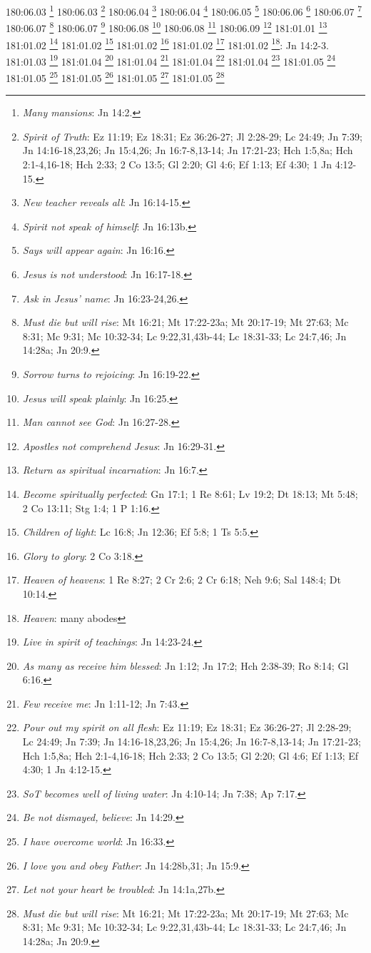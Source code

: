 {{{{{{{{{{{{{{{{{{{{{{{{{{{{{{{{{{{{{{{{{{{{{{{{{{{{{{{{{{{{{{{{{{{{{{{{{{{{{{{180:06.03 \footnote{\textit{Many mansions}: Jn 14:2.}
180:06.03 \footnote{\textit{Spirit of Truth}: Ez 11:19; Ez 18:31; Ez 36:26-27; Jl 2:28-29; Lc 24:49; Jn 7:39; Jn 14:16-18,23,26; Jn 15:4,26; Jn 16:7-8,13-14; Jn 17:21-23; Hch 1:5,8a; Hch 2:1-4,16-18; Hch 2:33; 2 Co 13:5; Gl 2:20; Gl 4:6; Ef 1:13; Ef 4:30; 1 Jn 4:12-15.}
180:06.04 \footnote{\textit{New teacher reveals all}: Jn 16:14-15.}
180:06.04 \footnote{\textit{Spirit not speak of himself}: Jn 16:13b.}
180:06.05 \footnote{\textit{Says will appear again}: Jn 16:16.}
180:06.06 \footnote{\textit{Jesus is not understood}: Jn 16:17-18.}
180:06.07 \footnote{\textit{Ask in Jesus' name}: Jn 16:23-24,26.}
180:06.07 \footnote{\textit{Must die but will rise}: Mt 16:21; Mt 17:22-23a; Mt 20:17-19; Mt 27:63; Mc 8:31; Mc 9:31; Mc 10:32-34; Lc 9:22,31,43b-44; Lc 18:31-33; Lc 24:7,46; Jn 14:28a; Jn 20:9.}
180:06.07 \footnote{\textit{Sorrow turns to rejoicing}: Jn 16:19-22.}
180:06.08 \footnote{\textit{Jesus will speak plainly}: Jn 16:25.}
180:06.08 \footnote{\textit{Man cannot see God}: Jn 16:27-28.}
180:06.09 \footnote{\textit{Apostles not comprehend Jesus}: Jn 16:29-31.}
181:01.01 \footnote{\textit{Return as spiritual incarnation}: Jn 16:7.}
181:01.02 \footnote{\textit{Become spiritually perfected}: Gn 17:1; 1 Re 8:61; Lv 19:2; Dt 18:13; Mt 5:48; 2 Co 13:11; Stg 1:4; 1 P 1:16.}
181:01.02 \footnote{\textit{Children of light}: Lc 16:8; Jn 12:36; Ef 5:8; 1 Ts 5:5.}
181:01.02 \footnote{\textit{Glory to glory}: 2 Co 3:18.}
181:01.02 \footnote{\textit{Heaven of heavens}: 1 Re 8:27; 2 Cr 2:6; 2 Cr 6:18; Neh 9:6; Sal 148:4; Dt 10:14.}
181:01.02 \footnote{\textit{Heaven}: many abodes}: Jn 14:2-3.}
181:01.03 \footnote{\textit{Live in spirit of teachings}: Jn 14:23-24.}
181:01.04 \footnote{\textit{As many as receive him blessed}: Jn 1:12; Jn 17:2; Hch 2:38-39; Ro 8:14; Gl 6:16.}
181:01.04 \footnote{\textit{Few receive me}: Jn 1:11-12; Jn 7:43.}
181:01.04 \footnote{\textit{Pour out my spirit on all flesh}: Ez 11:19; Ez 18:31; Ez 36:26-27; Jl 2:28-29; Lc 24:49; Jn 7:39; Jn 14:16-18,23,26; Jn 15:4,26; Jn 16:7-8,13-14; Jn 17:21-23; Hch 1:5,8a; Hch 2:1-4,16-18; Hch 2:33; 2 Co 13:5; Gl 2:20; Gl 4:6; Ef 1:13; Ef 4:30; 1 Jn 4:12-15.}
181:01.04 \footnote{\textit{SoT becomes well of living water}: Jn 4:10-14; Jn 7:38; Ap 7:17.}
181:01.05 \footnote{\textit{Be not dismayed, believe}: Jn 14:29.}
181:01.05 \footnote{\textit{I have overcome world}: Jn 16:33.}
181:01.05 \footnote{\textit{I love you and obey Father}: Jn 14:28b,31; Jn 15:9.}
181:01.05 \footnote{\textit{Let not your heart be troubled}: Jn 14:1a,27b.}
181:01.05 \footnote{\textit{Must die but will rise}: Mt 16:21; Mt 17:22-23a; Mt 20:17-19; Mt 27:63; Mc 8:31; Mc 9:31; Mc 10:32-34; Lc 9:22,31,43b-44; Lc 18:31-33; Lc 24:7,46; Jn 14:28a; Jn 20:9.}
}}}}}}}}}}}}}}}}}}}}}}}}}}}}}}}}}}}}}}}}}}}}}}}}}}}}}}}}}}}}}}}}}}}}}}}}}}}}}}

